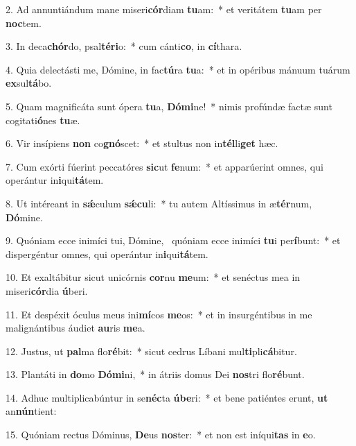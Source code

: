 2. Ad annuntiándum mane miseri\textbf{cór}diam \textbf{tu}am:~*  et veritátem \textbf{tu}am per \textbf{noc}tem.\

3. In deca\textbf{chór}do, psal\textbf{té}\textbf{ri}o:~*  cum cánti\textbf{co}, in \textbf{cí}thara.\

4. Quia delectásti me, Dómine, in fac\textbf{tú}ra \textbf{tu}a:~*  et in opéribus mánuum tuárum \textbf{ex}sul\textbf{tá}bo.\

5. Quam magnificáta sunt ópera \textbf{tu}a, \textbf{Dó}\textbf{mi}ne!~*  nimis profúndæ factæ sunt cogitati\textbf{ó}nes \textbf{tu}æ.\

6. Vir insípiens \textbf{non} co\textbf{gnó}scet:~*  et stultus non in\textbf{tél}li\textbf{get} hæc.\

7. Cum exórti fúerint peccatóres \textbf{sic}ut \textbf{fe}num:~*  et apparúerint omnes, qui operántur in\textbf{i}qui\textbf{tá}tem.\

8. Ut intéreant in \textbf{sǽ}culum \textbf{sǽ}\textbf{cu}li:~*  tu autem Altíssimus in æ\textbf{tér}num, \textbf{Dó}mine.\

9. Quóniam ecce inimíci tui, Dómine, \dag\  quóniam ecce inimíci \textbf{tu}i per\textbf{í}bunt:~*  et dispergéntur omnes, qui operántur in\textbf{i}qui\textbf{tá}tem.\

10. Et exaltábitur sicut unicórnis \textbf{cor}nu \textbf{me}um:~*  et senéctus mea in miseri\textbf{cór}dia \textbf{ú}beri.\

11. Et despéxit óculus meus ini\textbf{mí}cos \textbf{me}os:~*  et in insurgéntibus in me malignántibus áudiet \textbf{au}ris \textbf{me}a.\

12. Justus, ut \textbf{pal}ma flo\textbf{ré}bit:~*  sicut cedrus Líbani mul\textbf{ti}pli\textbf{cá}bitur.\

13. Plantáti in \textbf{do}mo \textbf{Dó}\textbf{mi}ni,~*  in átriis domus Dei \textbf{nos}tri flo\textbf{ré}bunt.\

14. Adhuc multiplicabúntur in se\textbf{néc}ta \textbf{ú}\textbf{be}ri:~*  et bene patiéntes erunt, \textbf{ut} an\textbf{nún}tient:\

15. Quóniam rectus Dóminus, \textbf{De}us \textbf{nos}ter:~*  et non est iníqui\textbf{tas} in \textbf{e}o.\

